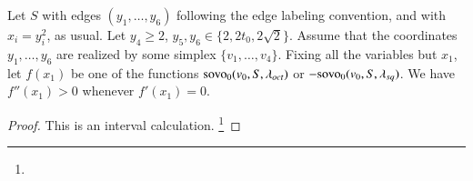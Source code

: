 \begin{lemma}\label{lemma:convex-deform-ht}
Let $S$ with edges $(y_1,\ldots,y_6)$ following the edge labeling
convention, and with $x_i=y_i^2$,
as usual.  Let $y_4\ge 2$,
    $y_5,y_6\in\{2,2t_0,2\sqrt{2}\}$.
Assume that the coordinates $y_1,\ldots,y_6$ are realized by
some simplex $\{v_1,\ldots,v_4\}$.  %
Fixing all the variables but $x_1$, let $f(x_1)$ be one of the
functions ${\operatorname{sovo}}_0(v_0,S,\lambda_{oct})$ or 
$-{\operatorname{sovo}}_0(v_0,S,\lambda_{sq})$. We have $f''(x_1)>0$
whenever $f'(x_1)=0$.
\end{lemma}

\begin{proof} This is an interval calculation.%
\footnote{} %
\end{proof}









